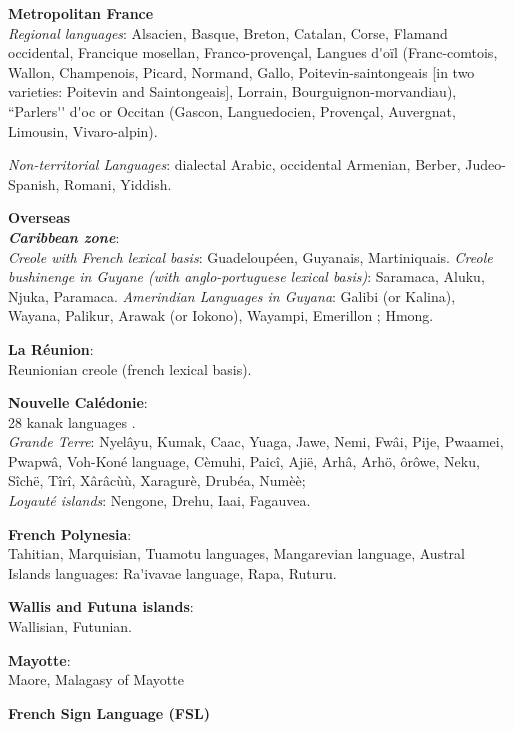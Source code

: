 \documentclass[]{../metanetpaper}
\begin{document}
\begin{multicols}{2}
{\bf Metropolitan France}\\
{\it Regional languages}: Alsacien, Basque, Breton, Catalan, Corse, Flamand occidental, Francique mosellan, Franco-provençal, Langues d{\mbox '}oïl (Franc-comtois, Wallon, Champenois, Picard, Normand, Gallo, Poitevin-saintongeais [in two varieties: Poitevin and Saintongeais], Lorrain, Bourguignon-morvandiau), ``Parlers{\mbox '}{\mbox '} d{\mbox '}oc or Occitan (Gascon, Languedocien, Provençal, Auvergnat, Limousin, Vivaro-alpin).

{\it Non-territorial Languages}: dialectal Arabic, occidental Armenian, Berber, Judeo-Spanish, Romani, Yiddish.

{\bf Overseas}\\
\textbf{ \emph{Caribbean zone}}:\\
{\it Creole with French lexical basis}: Guadeloupéen, Guyanais, Martiniquais.
{\it Creole bushinenge in Guyane (with anglo-portuguese lexical basis)}: Saramaca, Aluku, Njuka, Paramaca.
{\it Amerindian Languages in Guyana}: Galibi (or Kalina), Wayana, Palikur, Arawak (or Iokono), Wayampi, Emerillon ; Hmong.

{\bf La Réunion}:\\
Reunionian creole  (french lexical basis).

{\bf Nouvelle Calédonie}:\\
28 kanak languages .\\
{\it Grande Terre}: Nyelâyu, Kumak, Caac, Yuaga, Jawe, Nemi, Fwâi, Pije, Pwaamei, Pwapwâ, Voh-Koné language, Cèmuhi, Paicî, Ajië, Arhâ, Arhö, ôrôwe, Neku, Sîchë, Tîrî, Xârâcùù, Xaragurè, Drubéa, Numèè; \\
{\it Loyauté islands}: Nengone, Drehu, Iaai, Fagauvea.

{\bf French Polynesia}:\\
Tahitian, Marquisian, Tuamotu languages, Mangarevian language, Austral Islands languages: Ra{\mbox '}ivavae language, Rapa, Ruturu.

{\bf Wallis and Futuna islands}:\\
Wallisian, Futunian.

{\bf Mayotte}:\\
Maore, Malagasy of Mayotte

{\bf French Sign Language (FSL)}\\

\end{multicols}

\clearpage

\end{document}
